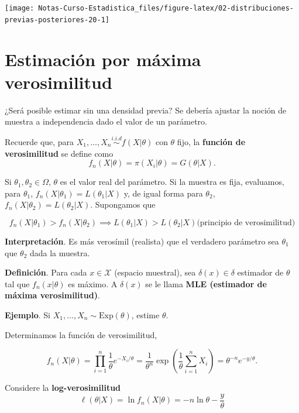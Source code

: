 \documentclass[
  12pt,
]{book}
\begin{document}
\begin{center}\texttt{[image: Notas-Curso-Estadistica\_files/figure-latex/02-distribuciones-previas-posteriores-20-1]} \end{center}

\hypertarget{estimaciuxf3n-por-muxe1xima-verosimilitud}{%
\chapter{Estimación por máxima verosimilitud}\label{estimaciuxf3n-por-muxe1xima-verosimilitud}}

¿Será posible estimar sin una densidad previa? Se debería ajustar la noción de
muestra a independencia dado el valor de un parámetro.

Recuerde que, para \(X_1,\dots, X_n \stackrel{i.i.d}{\sim} f(X|\theta)\) con \(\theta\)
fijo, la \textbf{función de verosimilitud} se define como \[ f_n(X|\theta) =
\pi(X_i|\theta) = G(\theta|X).\]

Si \(\theta_1,\theta_2\in \Omega\), \(\theta\) es el valor real del parámetro. Si la muestra es
fija, evaluamos, para \(\theta_1\), \(f_n(X|\theta_1) = L(\theta_1|X)\) y, de igual forma para
\(\theta_2\), \(f_n(X|\theta_2) = L(\theta_2|X)\). Supongamos que

\begin{equation*}
f_n(X|\theta_1) >f_n(X|\theta_2) \implies L(\theta_1|X)>L(\theta_2|X) \text{
(principio de verosimilitud)} 
\end{equation*}

\textbf{Interpretación}. Es más verosímil (realista) que el verdadero parámetro sea
\(\theta_1\) que \(\theta_2\) dada la muestra.

\textbf{Definición}. Para cada \(x\in \mathcal{X}\) (espacio muestral), sea
\(\delta(x) \in \delta\) estimador de \(\theta\) tal que \(f_n(x|\theta)\) es máximo. A
\(\delta(x)\) se le llama \textbf{MLE (estimador de máxima verosimilitud)}.

\textbf{Ejemplo}. Si \(X_1,\dots, X_n \sim \text{Exp}(\theta)\), estime \(\theta\).

Determinamos la función de verosimilitud,

\begin{equation*} 
f_n(X|\theta) =
\prod_{i=1}^n \dfrac{1}\theta e^{-X_i/\theta} = \dfrac1{\theta^n}
\exp\left(\dfrac{1}\theta \sum_{i=1}^nX_i\right) = \theta^{-n}e^{-y/\theta}.
\end{equation*}

Considere la \textbf{log-verosimilitud}
\begin{equation*}
\ell(\theta|X) = \ln f_n(X|\theta) = -n\ln \theta - \dfrac{y}{\theta}
\end{equation*}
\end{document}
